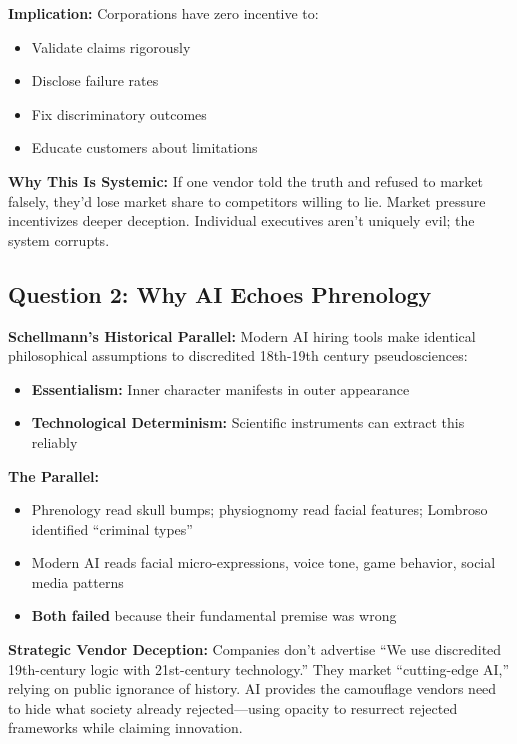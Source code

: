 \documentclass[12pt,letterpaper]{article}
\begin{document}
\textbf{Implication:} Corporations have zero incentive to:
\begin{itemize}[leftmargin=*,noitemsep]
    \item Validate claims rigorously
    \item Disclose failure rates
    \item Fix discriminatory outcomes
    \item Educate customers about limitations
\end{itemize}

\textbf{Why This Is Systemic:} If one vendor told the truth and refused to market falsely, they'd lose market share to competitors willing to lie. Market pressure incentivizes deeper deception. Individual executives aren't uniquely evil; the system corrupts.

\subsection*{Question 2: Why AI Echoes Phrenology}

\textbf{Schellmann's Historical Parallel:} Modern AI hiring tools make identical philosophical assumptions to discredited 18th-19th century pseudosciences:

\begin{itemize}[leftmargin=*,noitemsep]
    \item \textbf{Essentialism:} Inner character manifests in outer appearance
    \item \textbf{Technological Determinism:} Scientific instruments can extract this reliably
\end{itemize}

\textbf{The Parallel:}
\begin{itemize}[leftmargin=*,noitemsep]
    \item Phrenology read skull bumps; physiognomy read facial features; Lombroso identified ``criminal types''
    \item Modern AI reads facial micro-expressions, voice tone, game behavior, social media patterns
    \item \textbf{Both failed} because their fundamental premise was wrong
\end{itemize}

\begin{criticalinsight}
\textbf{Strategic Vendor Deception:} Companies don't advertise ``We use discredited 19th-century logic with 21st-century technology.'' They market ``cutting-edge AI,'' relying on public ignorance of history. AI provides the camouflage vendors need to hide what society already rejected—using opacity to resurrect rejected frameworks while claiming innovation.
\end{criticalinsight}
\end{document}
